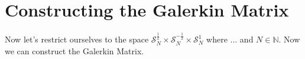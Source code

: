 \documentclass[10pt,journal,compsoc, onecolumn]{IEEEtran}
\begin{document}
\begin{comment}
Definition 3.21. For \(0 \leq s<\infty\) the space \(\mathcal{H}^{s}(\mathbb{S})\) is defined as the subspace of all functions
\(\varphi \in L^{2}(\mathbb{S})\) with the property
$$
\sum_{n \in \mathbb{Z}}\left(1+n^{2}\right)^{s}\left|\varphi_{n}\right|^{2}<\infty
$$ 
for the Fourier coefficients \(\varphi_{n}\) of \(\varphi\). With the inner product defined by
$$
(\varphi, \psi)_{\mathcal{H}^{s}(\mathbb{S})}:=\sum_{n \in \mathbb{Z}}\left(1+n^{2}\right)^{s} \varphi_{n} \overline{\psi_{n}}
$$

The Neumann trace space \(H^{-\frac{1}{2}}(\Gamma)\) is the Hilbert space obtained by the completion of \(C^{0}(\Gamma)\) with
respect to the norm
$$
\|\phi\|_{H^{-\frac{1}{2}(\Gamma)}}:=\|\widetilde{\phi}\|_{\widetilde{H}^{-1}(\Omega)}
$$

The norm is defined by this: 

Definition 1.1.80. Dual norm for source charge distributions
For \(\rho \in L^{2}(\Omega)\) let \(\widetilde{\rho} \in L^{2}\left(\mathbb{R}^{3}\right)\) be its extension by zero to \(\mathbb{R}^{3}\) and define
\(\|\rho\|_{\tilde{H}^{-1}(\Omega)}:=|u|_{H^{1}\left(\mathbb{R}^{3}\right)} \quad\) where \(u\) solves \(\left\{\begin{array}{r}-\Delta u=\widetilde{\rho} \text { in } \mathbb{R}^{3} \\ u \text { satisfies decay conditions }(1.1 .76)\end{array}\right.\)
The completion of \(L^{2}(\Omega)\) w.r.t. \(\|\cdot\|_{\tilde{H}^{-1}(\Omega)}\) yields the Hilbert space \(\widetilde{H}^{-1}(\Omega)\)

Decay condition: 
\(|u(x)|=O\left(\|x\|^{-1}\right) \quad\) and \(\quad\|\operatorname{grad} u(x)\|=O\left(\|x\|^{-2}\right) \quad\) for \(\quad\|x\| \rightarrow \infty\) (1.1.76)
\end{comment}
\section{Constructing the Galerkin Matrix}
Now let's restrict ourselves to the space $\mathcal{S}_N^{\frac{1}{2}} \times \mathcal{S}_N^{-\frac{1}{2}} \times \mathcal{S}_N^{1}$ where ... and $N \in \mathbb{N}$. 
Now we can construct the Galerkin Matrix.
\end{document}
